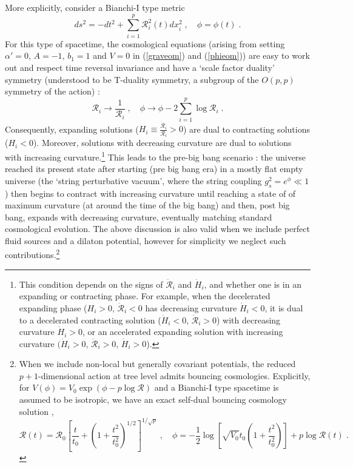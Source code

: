 \documentclass[amsmath,amssymb,11pt]{article}
\newcommand{\beq}{\begin{equation}}
\newcommand{\eeq}{\end{equation}}
\begin{document}
More explicitly, consider a Bianchi-I type metric
\beq ds^{2}=-dt^{2}+\sum_{i=1}^{p}\mathcal{R}_{i}^{2}(t)dx_{i}^{2}\;,\quad \phi=\phi(t)\;.\eeq
For this type of spacetime, the cosmological equations (arising from setting $\alpha'=0$, $A=-1$, $b_{1}=1$ and $V=0$ in (\ref{graveom}) and (\ref{phieom}))  are easy to work out and respect time reversal invariance and have a `scale factor duality' symmetry (understood to be T-duality symmetry, a subgroup of the $O(p,p)$ symmetry of the action) \cite{Gasperini:1991ak,Gasperini:1992em}:
\beq \mathcal{R}_{i}\to\frac{1}{\mathcal{R}_{i}}\;,\quad \phi\to\phi-2\sum_{i=1}^{p}\log\mathcal{R}_{i}\;.\eeq
Consequently, expanding solutions ($H_{i}\equiv\frac{\dot{\mathcal{R}}_{i}}{\mathcal{R}_{i}}>0$) are dual to contracting solutions ($H_{i}<0$). Moreover, solutions with decreasing curvature are dual to solutions with increasing curvature.\footnote{This condition depends on the signs of $\ddot{\mathcal{R}}_{i}$ and $\dot{H}_{i}$, and whether one is in an expanding or contracting phase. For example, when the decelerated expanding phase ($H_{i}>0$, $\ddot{\mathcal{R}}_{i}<0$ has decreasing curvature $\dot{H}_{i}<0$, it is dual to a decelerated contracting solution ($\dot{H}_{i}<0$, $\ddot{\mathcal{R}}_{i}>0$) with decreasing curvature $\dot{H}_{i}>0$, or an accelerated expanding solution with increasing curvature $(\dot{H}_{i}>0$, $\ddot{\mathcal{R}}_{i}>0$, $\dot{H}_{i}>0$).} This leads to the pre-big bang scenario \cite{Gasperini:1992em}: the universe reached its present state after starting (pre big bang era) in a mostly flat empty universe (the `string perturbative vacuum', where the string coupling $g_{s}^{2}=e^{\phi}\ll1$) then begins to contract with increasing curvature until reaching a state of of maximum curvature (at around the time of the big bang) and then, post big bang, expands with decreasing curvature, eventually matching standard cosmological evolution.  The above discussion is also valid when we include perfect fluid sources and a dilaton potential, however for simplicity we neglect such contributions.\footnote{When we include non-local but generally covariant potentials, the reduced $p+1$-dimensional action at tree level admits bouncing cosmologies. Explicitly, for $V(\phi)=V_{0}\exp\left(\phi-p\log \mathcal{R}\right)$ and a Bianchi-I type spacetime is assumed to be isotropic, we have an exact self-dual bouncing cosmology solution \cite{Gasperini:1996np},
$$\mathcal{R}(t)=\mathcal{R}_{0}\left[\frac{t}{t_{0}}+\left(1+\frac{t^{2}}{t_{0}^{2}}\right)^{1/2}\right]^{1/\sqrt{p}}\;,\quad \phi=-\frac{1}{2}\log\left[\sqrt{V_{0}}t_{0}\left(1+\frac{t^{2}}{t_{0}^{2}}\right)\right]+p\log\mathcal{R}(t)\;.$$}
\end{document}
